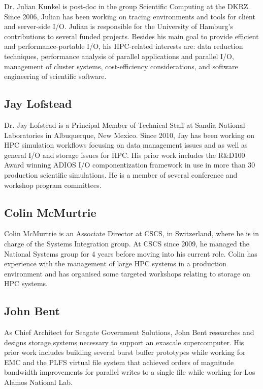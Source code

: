 \documentclass[a4paper,10pt]{article}
\begin{document}
Dr. Julian Kunkel is post-doc in the group Scientific Computing at the DKRZ.
Since 2006, Julian has been working on tracing environments and tools for client and server-side I/O.
Julian is responsible for the University of Hamburg's contributions to several funded projects.  
Besides his main goal to provide efficient and performance-portable I/O, his HPC-related interests are: data reduction techniques, performance analysis of parallel applications and parallel I/O, management of cluster systems, cost-efficiency considerations, and software engineering of scientific software.

\subsection{Jay Lofstead}
Dr. Jay Lofstead is a Principal Member of Technical Staff at Sandia National
Laboratories in Albuquerque, New Mexico. Since 2010, Jay has been working on
HPC simulation workflows focusing on data management issues and as well as
general I/O and storage issues for HPC.  His prior work includes the R\&D100
Award winning ADIOS I/O componentization framework in use in more than 30
production scientific simulations. He is a member of several conference and
workshop program committees.

\subsection{Colin McMurtrie}
Colin McMurtrie is an Associate Director at CSCS, in Switzerland, where he is in charge of the Systems Integration group.  At CSCS since 2009, he managed the National Systems group for 4 years before moving into his current role.  Colin has experience with the management of large HPC systems in a production environment and has organised some targeted workshops relating to storage on HPC systems.

\subsection{John Bent}
As Chief Architect for Seagate Government Solutions, John Bent researches and designs storage systems necessary to support an exascale supercomputer.  His prior work
includes building several burst buffer prototypes while working for EMC and the PLFS virtual file system that achieved orders of magnitude bandwidth improvements for parallel writes to a single file while working for Los Alamos National Lab.
\end{document}
